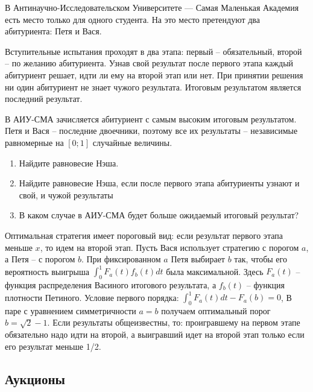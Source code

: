 \begin{problem}
В Антинаучно-Исследовательском Университете — Самая Маленькая Академия есть место только для одного студента. На это место претендуют два абитуриента: Петя и Вася.

Вступительные испытания проходят в два этапа: первый -- обязательный, второй -- по желанию абитуриента. Узнав свой результат после первого этапа каждый абитуриент решает, идти ли ему на второй этап или нет. При принятии решения ни один абитуриент не знает чужого результата. Итоговым результатом является последний результат.

В АИУ-СМА зачисляется абитуриент с самым высоким итоговым результатом. Петя и Вася -- последние двоечники, поэтому все их результаты -- независимые равномерные на $[0;1]$ случайные величины.

\begin{enumerate}
\item Найдите равновесие Нэша.
\item Найдите равновесие Нэша, если после первого этапа абитуриенты узнают и свой, и чужой результаты
\item В каком случае в АИУ-СМА будет больше ожидаемый итоговый результат?
\end{enumerate}




\begin{sol}
Оптимальная стратегия имеет пороговый вид: если результат первого этапа меньше $x$, то идем на второй этап. Пусть Вася использует стратегию с порогом $a$, а Петя -- с порогом $b$. При фиксированном $a$ Петя выбирает $b$ так, чтобы его вероятность выигрыша $\int_{0}^{1}F_{a}(t)f_{b}(t)dt$ была максимальной. Здесь $F_{a}(t)$ -- функция распределения Васиного итогового результата, а $f_{b}(t)$ -- функция плотности Петиного. Условие первого порядка: $\int_{0}^{1}F_{a}(t)dt-F_{a}(b)=0$,  В паре с уравнением симметричности $a=b$ получаем оптимальный порог $b=\sqrt{2}-1$. Если результаты общеизвестны, то: проигравшему на первом этапе обязательно надо идти на второй, а выигравший идет на второй этап только если его результат меньше 1/2.
\end{sol}
\end{problem}



\subsection{Аукционы}

